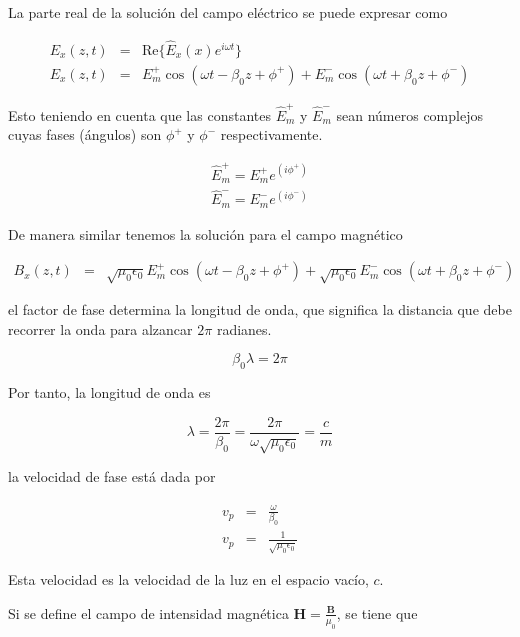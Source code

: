 La parte real de la solución del campo eléctrico se puede expresar como

\begin{eqnarray*}
E_x(z,t) &=& \text{Re} \{ \hat{E}_x(x) e^{i \omega t} \}  \\
E_x(z,t) &=& E_m^+ \cos (\omega t - \beta_0 z + \phi^+) + E_m^- \cos (\omega t + \beta_0 z + \phi^-)
\end{eqnarray*}

Esto teniendo en cuenta que las constantes $\hat{E}_m^+$ y $\hat{E}_m^-$ sean números complejos cuyas fases (ángulos) son $\phi^+$ y $\phi^-$ respectivamente.

\begin{eqnarray*}
\hat{E}_m^+ = E_m^+ e ^(i \phi^+) \\
\hat{E}_m^- = E_m^- e ^(i \phi^-) 
\end{eqnarray*}


De manera similar tenemos la solución para el campo magnético 


\begin{eqnarray*}
B_x(z,t) &=& \sqrt{\mu_0\epsilon_0} E_m^+ \cos (\omega t - \beta_0 z + \phi^+) + \sqrt{\mu_0\epsilon_0} E_m^- \cos (\omega t + \beta_0 z + \phi^-)
\end{eqnarray*}

el factor de fase determina la longitud de onda, que significa la distancia que debe recorrer la onda para alzancar $2 \pi$ radianes.

\begin{equation*}
\beta_0 \lambda = 2 \pi
\end{equation*}


Por tanto, la longitud de onda es


\begin{equation*}
\lambda = \frac{2 \pi}{\beta_0} = \frac{2 \pi}{\omega \sqrt{\mu_0\epsilon_0}} = \frac{c}{m}
\end{equation*}


la velocidad de fase está dada por 


\begin{eqnarray*}
v_p &=& \frac{\omega}{\beta_0} \\
v_p &=& \frac{1}{\sqrt{\mu_0\epsilon_0}}
\end{eqnarray*}

Esta velocidad es la velocidad de la luz en el espacio vacío, $c$.


Si se define el campo de intensidad magnética $\mathbf{H} = \frac{\mathbf{B}}{\mu_0}$, se tiene que 

